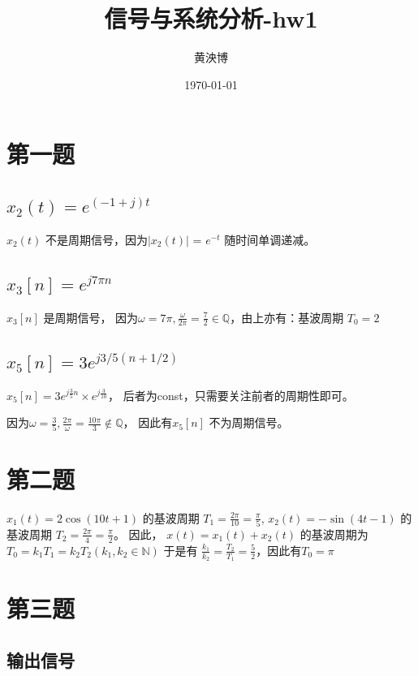 \documentclass[UTF8, fontset=fandol,12pt, a4paper]{ctexart}
\title{信号与系统分析-hw1}
\author{黄泱博 \quad 2024012867}
\date{\today}
\begin{document}
\maketitle

\section* {第一题}

\subsection{$x_2(t) = e^{(-1+j)t}$}

$x_2(t)$ 不是周期信号，因为$\lvert x_2(t) \rvert$ = $e^{-t}$ 随时间单调递减。

\subsection{$x_3[n] = e^{j7\pi n}$}

$x_3[n]$ 是周期信号， 因为$\omega = 7\pi, \frac{\omega}{2\pi} = \frac{7}{2} \in \mathbb{Q}$，由上亦有：基波周期 $T_0 = 2$

\subsection{$x_5[n] = 3e^{j3/5(n+1/2)}$}

$x_5[n] = 3e^{j\frac{3}{5}n} \times e^{j\frac{3}{10}}$， 后者为const，只需要关注前者的周期性即可。

因为$\omega = \frac{3}{5}, \frac{2\pi}{\omega} = \frac{10\pi}{3} \notin \mathbb{Q}$， 因此有$x_5[n]$ 不为周期信号。

\section* {第二题}

$x_1(t) = 2\cos{(10t+1)}$ 的基波周期 $T_1 = \frac{2\pi}{10} = \frac{\pi}{5}$, $x_2(t) = -\sin{(4t-1)}$ 的基波周期 $T_2 = \frac{2\pi}{4} = \frac{\pi}{2}$。 因此， $x(t) = x_1(t) + x_2(t)$ 的基波周期为 $T_0 = k_1 T_1 = k_2 T_2 (k_1, k_2 \in \mathbb{N}) $ 于是有 $\frac{k_1}{k_2} = \frac{T_2}{T_1} = \frac{5}{2}$，因此有$T_0 = \pi$

\section* {第三题}

\subsection {输出信号}
\end{document}
